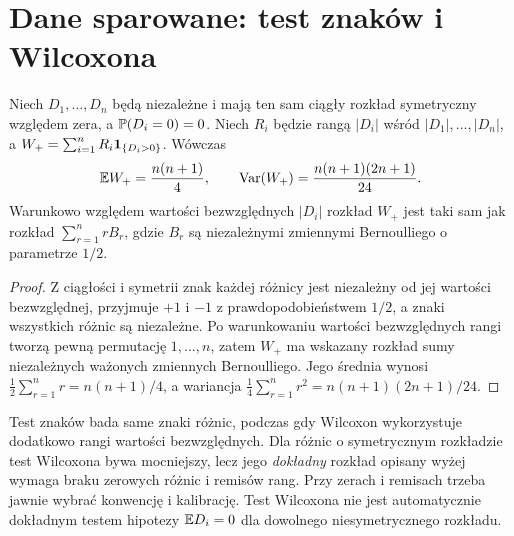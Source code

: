 \section{Dane sparowane: test znaków i Wilcoxona}
\begin{twierdzenie}
\label{thm:wilcoxon-signed-rank}
Niech $D_1,\ldots,D_n$ będą niezależne i mają ten sam
ciągły rozkład symetryczny względem zera, a
$\mathbb P(D_i=0)=0$. Niech $R_i$ będzie rangą
$|D_i|$ wśród $|D_1|,\ldots,|D_n|$, a
$W_+=\sum_{i=1}^nR_i\mathbf 1_{\{D_i>0\}}$.
Wówczas
\[
 \mathbb E W_+=\frac{n(n+1)}4,\qquad
 \operatorname{Var}(W_+)=\frac{n(n+1)(2n+1)}{24}.
\]
Warunkowo względem wartości bezwzględnych $|D_i|$
rozkład $W_+$ jest taki sam jak rozkład
$\sum_{r=1}^nrB_r$, gdzie $B_r$ są niezależnymi
zmiennymi Bernoulliego o parametrze $1/2$.
\end{twierdzenie}
\begin{proof}
Z ciągłości i symetrii znak każdej różnicy jest
niezależny od jej wartości bezwzględnej, przyjmuje
$+1$ i $-1$ z prawdopodobieństwem $1/2$,
a znaki wszystkich różnic są niezależne.
Po warunkowaniu wartości bezwzględnych rangi tworzą pewną permutację
$1,\ldots,n$, zatem $W_+$ ma wskazany rozkład sumy
niezależnych ważonych zmiennych Bernoulliego.
Jego średnia wynosi $\tfrac12\sum_{r=1}^nr=n(n+1)/4$,
a wariancja $\tfrac14\sum_{r=1}^nr^2
=n(n+1)(2n+1)/24$.
\end{proof}

\begin{uwaga}
Test znaków bada same znaki różnic, podczas gdy
Wilcoxon wykorzystuje dodatkowo rangi wartości
bezwzględnych. Dla różnic o symetrycznym rozkładzie
test Wilcoxona bywa mocniejszy, lecz jego
\emph{dokładny} rozkład opisany wyżej wymaga
braku zerowych różnic i remisów rang.
Przy zerach i remisach trzeba jawnie wybrać
konwencję i kalibrację. Test Wilcoxona nie jest
automatycznie dokładnym testem hipotezy
$\mathbb E D_i=0$ dla dowolnego niesymetrycznego rozkładu.
\end{uwaga}

